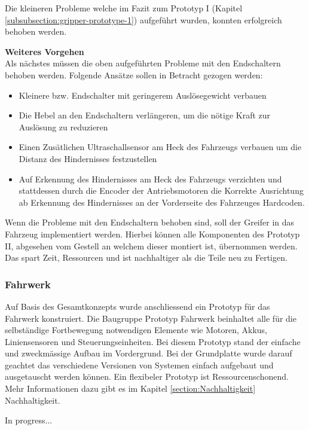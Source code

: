 Die kleineren Probleme welche im Fazit zum Prototyp I (Kapitel \ref{subsubsection:gripper-prototype-1}) aufgeführt wurden, konnten erfolgreich behoben werden.

\textbf{Weiteres Vorgehen}\\

Als nächstes müssen die oben aufgeführten Probleme mit den Endschaltern behoben werden. Folgende Ansätze sollen in Betracht gezogen werden:
\begin{itemize}
    \item Kleinere bzw. Endschalter mit geringerem Auslösegewicht verbauen
    \item Die Hebel an den Endschaltern verlängeren, um die nötige Kraft zur Auslösung zu reduzieren
    \item Einen Zusätlichen Ultraschallsensor am Heck des Fahrzeugs verbauen um die Distanz des Hindernisses festzustellen
    \item Auf Erkennung des Hindernisses am Heck des Fahrzeugs verzichten und stattdessen durch die Encoder der Antriebsmotoren die Korrekte Ausrichtung ab Erkennung des Hindernisses an der Vorderseite des Fahrzeuges Hardcoden.
\end{itemize}

Wenn die Probleme mit den Endschaltern behoben sind, soll der Greifer in das Fahrzeug implementiert werden. Hierbei können alle Komponenten des Prototyp II, abgesehen vom Gestell an welchem dieser montiert ist, übernommen werden. Das spart Zeit, Ressourcen und ist nachhaltiger als die Teile neu zu Fertigen.

\subsubsection{Fahrwerk}

Auf Basis des Gesamtkonzepts wurde anschliessend ein Prototyp für das Fahrwerk konstruiert. Die Baugruppe Prototyp Fahrwerk beinhaltet alle für die selbständige Fortbewegung notwendigen Elemente wie Motoren, Akkus, Liniensensoren und Steuerungseinheiten.  Bei diesem Prototyp stand der einfache und zweckmässige Aufbau im Vordergrund. Bei der Grundplatte wurde darauf geachtet das verschiedene  Versionen von Systemen einfach aufgebaut und ausgetauscht werden können. Ein flexibeler Prototyp ist Ressourcenschonend. Mehr Informationen dazu gibt es im Kapitel \ref{section:Nachhaltigkeit} Nachhaltigkeit. 

In progress...
